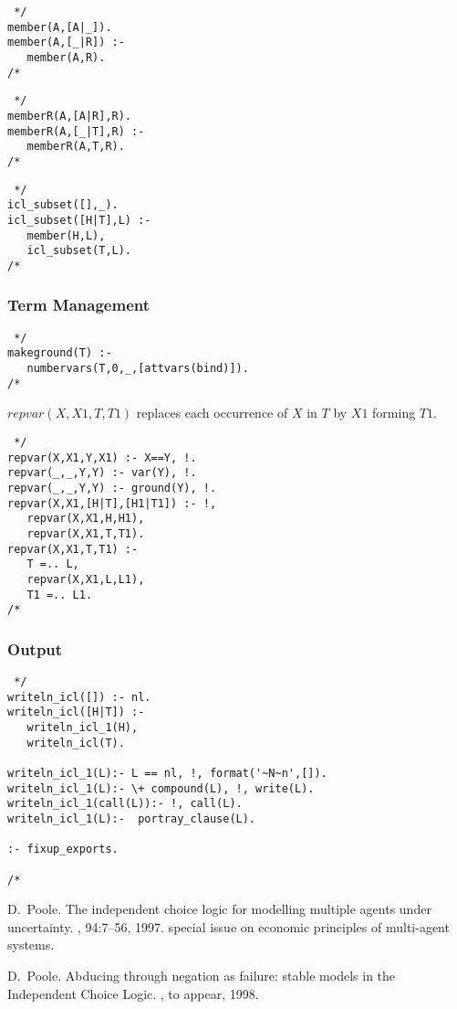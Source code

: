 \documentclass[11pt,fleqn]{article}
\begin{document}
\begin{verbatim} */
member(A,[A|_]).
member(A,[_|R]) :-
   member(A,R).
/* \end{verbatim}
\begin{verbatim} */
memberR(A,[A|R],R).
memberR(A,[_|T],R) :-
   memberR(A,T,R).
/* \end{verbatim}
\begin{verbatim} */
icl_subset([],_).
icl_subset([H|T],L) :-
   member(H,L),
   icl_subset(T,L).
/* \end{verbatim}
\subsubsection{Term Management}

\begin{verbatim} */
makeground(T) :-
   numbervars(T,0,_,[attvars(bind)]).
/* \end{verbatim}

$repvar(X,X1,T,T1)$ replaces each occurrence of $X$ in $T$ by $X1$ forming $T1$.
\begin{verbatim} */
repvar(X,X1,Y,X1) :- X==Y, !.
repvar(_,_,Y,Y) :- var(Y), !.
repvar(_,_,Y,Y) :- ground(Y), !.
repvar(X,X1,[H|T],[H1|T1]) :- !,
   repvar(X,X1,H,H1),
   repvar(X,X1,T,T1).
repvar(X,X1,T,T1) :-
   T =.. L,
   repvar(X,X1,L,L1),
   T1 =.. L1.
/* \end{verbatim}

\subsubsection{Output}
\begin{verbatim} */
writeln_icl([]) :- nl.
writeln_icl([H|T]) :-
   writeln_icl_1(H),
   writeln_icl(T).

writeln_icl_1(L):- L == nl, !, format('~N~n',[]).
writeln_icl_1(L):- \+ compound(L), !, write(L).
writeln_icl_1(call(L)):- !, call(L).
writeln_icl_1(L):-  portray_clause(L).

:- fixup_exports.

/* \end{verbatim}

%
%

\begin{thebibliography}{1}

D.~Poole.
\newblock The independent choice logic for modelling multiple agents under
  uncertainty.
, 94:7--56, 1997.
\newblock special issue on economic principles of multi-agent systems.

D.~Poole.
\newblock Abducing through negation as failure: stable models in the
  {Independent Choice Logic}.
, to appear, 1998.

\end{thebibliography}

\printindex
\end{document}
